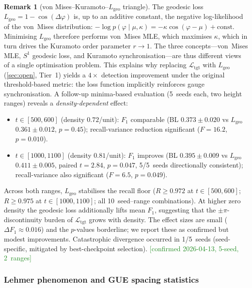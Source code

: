 \documentclass[11pt, a4paper]{article}
\theoremstyle{definition}
\newtheorem{remark}{Remark}[section]
\theoremstyle{plain}
\newcommand{\Ltgt}{\mathcal{L}_{\mathrm{tgt}}}
\begin{document}
\begin{remark}[von Mises--Kuramoto--$L_{\mathrm{geo}}$ triangle]
\label{rem:triangle}
The geodesic loss $L_{\mathrm{geo}} = 1 - \cos(\Delta\varphi)$
is, up to an additive constant, the negative log-likelihood of
the von~Mises distribution:
$-\log p(\varphi \mid \mu,\kappa)
  = -\kappa\cos(\varphi-\mu) + \mathrm{const}$.
Minimising $L_{\mathrm{geo}}$ therefore performs von~Mises MLE,
which maximises $\kappa$, which in turn drives the Kuramoto
order parameter $r \to 1$.  The three concepts---von~Mises MLE,
$S^1$ geodesic loss, and Kuramoto synchronisation---are thus
different views of a single optimisation problem.  This explains
why replacing $\Ltgt$ with $L_{\mathrm{geo}}$
(\cref{sec:open}, Tier~1) yields a $4\times$ detection
improvement under the original threshold-based metric: the loss
function implicitly reinforces gauge synchronisation.
A follow-up minima-based evaluation (5~seeds each, two height
ranges) reveals a \emph{density-dependent} effect:
\begin{itemize}
  \item \textbf{$t\in[500,600]$} (density $0.72$/unit):
    $F_1$ comparable (BL $0.373\pm0.020$ vs $L_{\mathrm{geo}}$
    $0.361\pm0.012$, $p{=}0.45$);
    recall-variance reduction significant
    ($F{=}16.2$, $p{=}0.010$).
  \item \textbf{$t\in[1000,1100]$} (density $0.81$/unit):
    $F_1$ improves (BL $0.395\pm0.009$ vs $L_{\mathrm{geo}}$
    $0.411\pm0.005$, paired $t{=}2.84$, $p{=}0.047$,
    5/5~seeds directionally consistent);
    recall-variance also significant ($F{=}6.5$, $p{=}0.049$).
\end{itemize}
Across both ranges, $L_{\mathrm{geo}}$ stabilises the recall
floor ($R\ge 0.972$ at $t\in[500,600]$; $R\ge 0.975$ at
$t\in[1000,1100]$; all 10~seed--range combinations).
At higher zero density the geodesic loss additionally lifts
mean $F_1$, suggesting that the $\pm\pi$-discontinuity burden
of $\Ltgt$ grows with density.  The effect sizes are small
($\Delta F_1 \approx 0.016$) and the $p$-values borderline;
we report these as confirmed but modest improvements.
Catastrophic divergence occurred in 1/5~seeds (seed-specific,
mitigated by best-checkpoint selection).
\textcolor{ForestGreen}{[confirmed 2026-04-13, 5-seed, 2~ranges]}
\end{remark}

\subsubsection{Lehmer phenomenon and GUE spacing statistics}
\label{sec:lehmer_gue}
\end{document}
